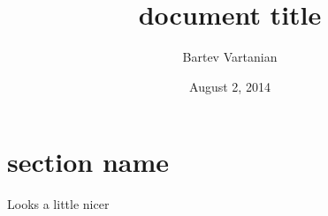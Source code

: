 \documentclass[letter, 11pt]{article}
\title{document title}
\author{Bartev Vartanian}
\date{August 2, 2014}
\begin{document}
 
\maketitle 
\section{section name} 

Looks a little nicer
\end{document}
